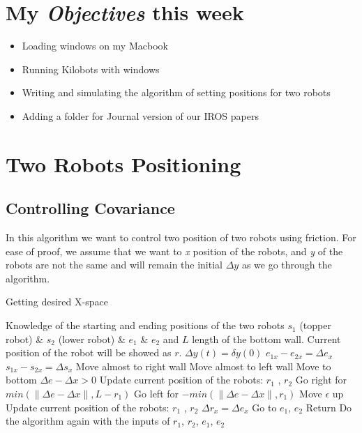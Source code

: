 \newcommand{\handoutName}{Weekly report}
\newcommand{\handoutdate}{\today}


\section{My \emph{Objectives} this week}
\begin{itemize}
\item Loading windows on my Macbook
\item Running Kilobots with windows
\item Writing and simulating the algorithm of setting positions for two robots
\item Adding a folder for Journal version of our IROS papers
\end{itemize}


\section{Two Robots Positioning}\label{sec:algorithm}


\subsection{Controlling Covariance}

In this algorithm we want to control two position of two robots using friction. For ease of proof, we assume that we want to \emph{x} position of the robots, and \emph{y} of the robots are not the same and will remain the initial $\Delta y $ as we go through the algorithm.
\begin{algorithm}
\caption{Getting desired X-space}\label{alg:XControl}
\begin{algorithmic}[1]
\Require Knowledge of the starting and ending positions  of the two robots $s_1$ (topper robot) \& $s_2$ (lower robot)  \& $e_1$  \& $e_2$  and $L$ length of the bottom wall. Current position of the robot will be showed as $r$.
\Ensure $\Delta y(t) = \delta y(0)$ 
\State $e_{1x} - e_{2x} = \Delta e_x$
\State $s_{1x} - s_{2x} = \Delta s_x$
\State Move almost to right wall
\Else Move almost to left wall
\EndIf
\State Move to bottom
\If $\Delta e - \Delta x > 0 $
\State Update current position of the robots: $r_1$ , $r_2$
\State Go right for $min(\|\Delta e - \Delta x \|, L- r_1)$
\Else Go left for $-min(\|\Delta e - \Delta x \|, r_1)$
\EndIf 
\State Move $\epsilon$ up
\State Update current position of the robots: $r_1$ , $r_2$
\If $\Delta r_x = \Delta e_x$ 
\State Go to $e_1$, $e_2$
\State Return
\Else Do the algorithm again with the inputs of $r_1$, $r_2$, $e_1$, $e_2$
\EndIf



\end{algorithmic}
\end{algorithm}


